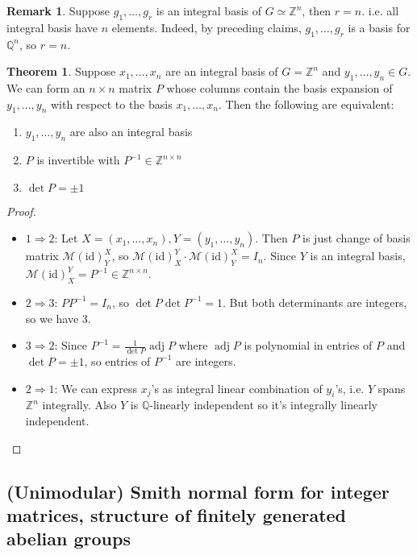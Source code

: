 \documentclass[a4paper]{article}
\newcommand{\adj}{\operatorname{adj}}
\theoremstyle{definition}
\newtheorem{thm}[defn]{Theorem}
\newtheorem*{remark}{Remark}
\begin{document}
\begin{remark}
Suppose $g_1,\ldots,g_r$ is an integral basis of $G \simeq \mathbb Z^n$, then $r=n$. i.e. all integral basis have $n$ elements. Indeed, by preceding claims, $g_1,\ldots,g_r$ is a basis for $\mathbb Q^n$, so $r=n$.
\end{remark}
\begin{thm}
Suppose $x_1,\ldots,x_n$ are an integral basis of $G=\mathbb Z^n$ and $y_1,\ldots,y_n \in G$. We can form an $n\times n$ matrix $P$ whose columns contain the basis expansion of $y_1,\ldots,y_n$ with respect to the basis $x_1,\ldots,x_n$. Then the following are equivalent:
\begin{enumerate}
    \item $y_1,\ldots,y_n$ are also an integral basis
    \item $P$ is invertible with $P^{-1} \in \mathbb Z^{n\times n}$
    \item $\det P = \pm 1$
\end{enumerate}
\end{thm}
\begin{proof}
\begin{itemize}
    \item $1\Rightarrow 2$: Let $X=(x_1,\ldots,x_n),Y=(y_1,\ldots,y_n)$. Then $P$ is just change of basis matrix $\mathcal M(\text{id})_Y^X$, so $\mathcal M(\text{id})_X^Y\cdot \mathcal M(\text{id})_Y^X=I_n$. Since $Y$ is an integral basis, $\mathcal M(\text{id})_X^Y=P^{-1}\in \mathbb Z^{n\times n}$.
    \item $2\Rightarrow 3$: $PP^{-1}=I_n$, so $\det P \det P^{-1}=1$. But both determinants are integers, so we have 3.
    \item $3\Rightarrow 2$: Since $P^{-1} = \frac{1}{\det P} \adj P$ where $\adj P$ is polynomial in entries of $P$ and $\det P=\pm 1$, so entries of $P^{-1}$ are integers.
    \item $2\Rightarrow 1$: We can express $x_j$'s as integral linear combination of $y_i$'s, i.e. $Y$ spans $\mathbb Z^n$ integrally. Also $Y$ is $\mathbb Q$-linearly independent so it's integrally linearly independent.
\end{itemize}
\end{proof}
\subsection{(Unimodular) Smith normal form for integer matrices, structure of finitely generated abelian groups}
\end{document}
